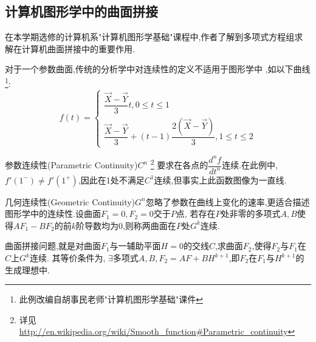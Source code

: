 \subsection{计算机图形学中的曲面拼接}
	在本学期选修的计算机系"计算机图形学基础"课程中,作者了解到多项式方程组求解在计算机曲面拼接中的重要作用.

	对于一个参数曲面,传统的分析学中对连续性的定义不适用于图形学中
	,如以下曲线\footnote{此例改编自胡事民老师"计算机图形学基础"课件}:
	\[  f(t) = \begin{cases} \dfrac{\overrightarrow X - \overrightarrow Y}{3}t,0\le t \le 1 \\
		\dfrac{\overrightarrow X - \overrightarrow Y}{3} + (t-1)\dfrac{2(\overrightarrow X - \overrightarrow Y)}{3},1 \le t \le 2
	\end{cases}\]

	参数连续性(Parametric Continuity)$ C^n $
	\footnote{详见\url{http://en.wikipedia.org/wiki/Smooth_function\#Parametric_continuity}}
	要求在各点的$ \dfrac{d^n f}{dt^n}$连续.在此例中,$ f'(1^-) \ne f'(1^+)$,因此在1处不满足$ C^1$连续,但事实上此函数图像为一直线.

	几何连续性(Geometric Continuity)$ G^n$忽略了参数在曲线上变化的速率,更适合描述图形学中的连续性.设曲面$ F_1 = 0, F_2 = 0$交于$ P$点,
	若存在$ P$处非零的多项式$ A,B$使得$ AF_1-BF_2$的前$ k$阶导数均为0,则称两曲面在$ P$处$ G^k$连续.

	曲面拼接问题,就是对曲面$ F_1$与一辅助平面$ H=0$的交线$ C$,求曲面$ F_2$,使得$ F_2$与$ F_1$在$ C$上$ G^k$连续.
	其等价条件为\cite{warren}, $ \exists \texttt{多项式}A,B,F_2 = AF + BH^{k+1}$,即$ F_2$在$ F_1$与$ H^{k+1}$的生成理想中.
